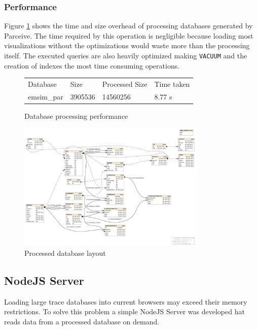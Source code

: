 \subsubsection{Performance}

Figure \ref{parceive:procperformance} shows the time and size overhead of processing databases generated by Parceive. The time required by this operation is negligible because loading most visualizations without the optimizations would waste more than the processing itself. The executed queries are also heavily optimized making \texttt{VACUUM} and the creation of indexes the most time consuming operations.

\begin{figure}
	\centering
	\begin{tabular}{l l l l}
		Database & Size & Processed Size & Time taken \\
		emsim\_par & 3905536 & 14560256 & 8.77 s
	\end{tabular}
	\caption{Database processing performance}
	\label{parceive:procperformance}
\end{figure}

\begin{figure}
	\centering
	\includegraphics[width=0.8\textwidth]{full-schema}
	\caption{Processed database layout}
	\label{parceive:proclayout}
\end{figure}

\subsection{NodeJS Server}

Loading large trace databases into current browsers may exceed their memory restrictions. To solve this problem a simple NodeJS Server was developed hat reads data from a processed database on demand.

